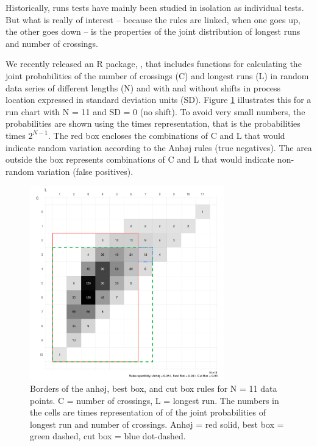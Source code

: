 Historically, runs tests have mainly been studied in isolation as
individual tests. But what is really of interest -- because the rules
are linked, when one goes up, the other goes down -- is the properties
of the joint distribution of longest runs and number of crossings.

We recently released an R package,  \citep{twl2018},
that includes functions for calculating the joint probabilities of the
number of crossings (C) and longest runs (L) in random data series of
different lengths (N) and with and without shifts in process location
expressed in standard deviation units (SD). Figure \ref{figure:box11}
illustrates this for a run chart with N = 11 and SD = 0 (no shift). To
avoid very small numbers, the probabilities are shown using the times
representation, that is the probabilities times \(2^{N-1}\). The red box
encloses the combinations of C and L that would indicate random
variation according to the Anhøj rules (true negatives). The area
outside the box represents combinations of C and L that would indicate
non-random variation (false positives).

\begin{figure}[htbp]
  \centering
  \includegraphics[width=0.75\textwidth]{fig_box11.pdf}
  \caption{Borders of the anhøj, best box, and cut box rules for N = 11 data points. 
           C = number of crossings, L = longest run.
           The numbers in the cells are times representation of of the joint
           probabilities of longest run and number of crossings.
           Anhøj = red solid, best box = green dashed, cut box = blue dot-dashed.}
  \label{figure:box11}
\end{figure}

